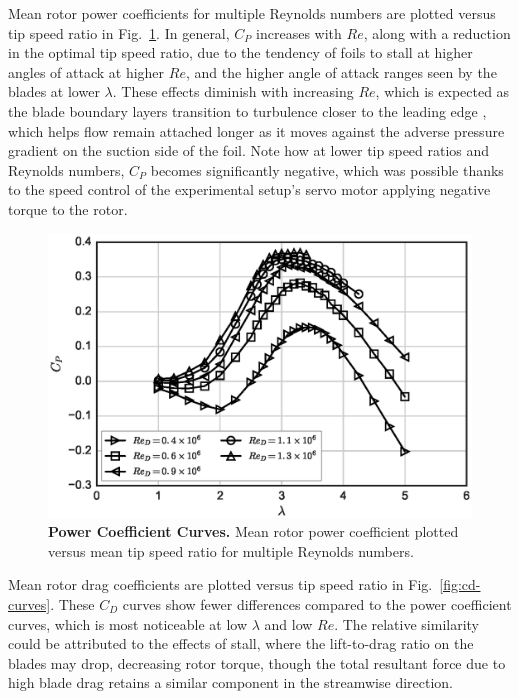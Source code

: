\documentclass[10pt,letterpaper]{article}
\begin{document}
Mean rotor power coefficients for multiple Reynolds numbers are plotted versus
tip speed ratio in Fig.~\ref{fig:cp-curves}. In general, $C_P$ increases with
$Re$, along with a reduction in the optimal tip speed ratio, due to the tendency
of foils to stall at higher angles of attack at higher $Re$, and the higher
angle of attack ranges seen by the blades at lower $\lambda$. These effects
diminish with increasing $Re$, which is expected as the blade boundary layers
transition to turbulence closer to the leading edge \cite{Lissaman1983,
    McMasters1980, Bachant2016-RVAT-Re-dep}, which helps flow remain attached longer
as it moves against the adverse pressure gradient on the suction side of the
foil. Note how at lower tip speed ratios and Reynolds numbers, $C_P$ becomes
significantly negative, which was possible thanks to the speed control of the
experimental setup's servo motor applying negative torque to the rotor.

\begin{figure}[h]
    \includegraphics[width=\textwidth]{figures/cp_curves.eps}

    \caption{{\bf Power Coefficient Curves.} Mean rotor power coefficient
    plotted versus mean tip speed ratio for multiple Reynolds numbers.}

    \label{fig:cp-curves}
\end{figure}

Mean rotor drag coefficients are plotted versus tip speed ratio in
Fig.~\ref{fig:cd-curves}. These $C_D$ curves show fewer differences compared to
the power coefficient curves, which is most noticeable at low $\lambda$ and low
$Re$. The relative similarity could be attributed to the effects of stall, where
the lift-to-drag ratio on the blades may drop, decreasing rotor torque, though
the total resultant force due to high blade drag retains a similar component in
the streamwise direction.
\end{document}
